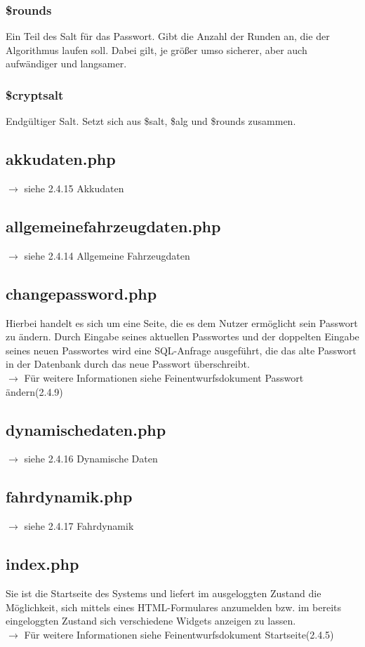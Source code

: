 \documentclass[fontsize = 12pt, paper = a4]{scrreprt}
\begin{document}
\subsubsection*{\$rounds}
Ein Teil des Salt für das Passwort. Gibt die Anzahl der Runden an, die der Algorithmus laufen soll. Dabei gilt, je größer umso sicherer, aber auch aufwändiger und langsamer.
\subsubsection*{\$cryptsalt}
Endgültiger Salt. Setzt sich aus \$salt, \$alg und \$rounds zusammen.

\newpage
\subsection{akkudaten.php}
$\rightarrow$ siehe 2.4.15 Akkudaten

\subsection{allgemeinefahrzeugdaten.php}
$\rightarrow$ siehe 2.4.14 Allgemeine Fahrzeugdaten

\subsection{changepassword.php}
Hierbei handelt es sich um eine Seite, die es dem Nutzer ermöglicht sein Passwort zu ändern. Durch Eingabe seines aktuellen Passwortes und der doppelten Eingabe seines neuen Passwortes wird eine SQL-Anfrage ausgeführt, die das alte Passwort in der Datenbank durch das neue Passwort überschreibt.\\
$\rightarrow$ Für weitere Informationen siehe Feinentwurfsdokument \glqq Passwort ändern\grqq (2.4.9)

\subsection{dynamischedaten.php}
$\rightarrow$ siehe 2.4.16 Dynamische Daten

\subsection{fahrdynamik.php}
$\rightarrow$ siehe 2.4.17 Fahrdynamik

\subsection{index.php}
Sie ist die Startseite des Systems und liefert im ausgeloggten Zustand die Möglichkeit, sich mittels eines HTML-Formulares anzumelden bzw. im bereits eingeloggten Zustand sich verschiedene Widgets anzeigen zu lassen.\\
$\rightarrow$ Für weitere Informationen siehe Feinentwurfsdokument \glqq Startseite\grqq (2.4.5)
\end{document}
